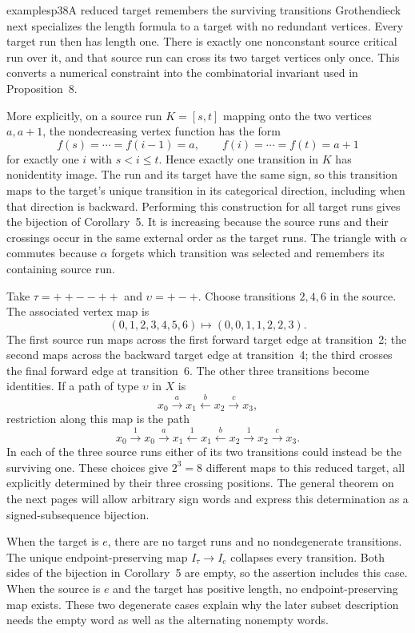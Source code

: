 \begin{dcomment}{examples}{p38}{A reduced target remembers the surviving transitions}
Grothendieck next specializes the length formula to a target with no redundant vertices. Every target run then has length one. There is exactly one nonconstant source critical run over it, and that source run can cross its two target vertices only once. This converts a numerical constraint into the combinatorial invariant used in Proposition~8.

More explicitly, on a source run $K=[s,t]$ mapping onto the two vertices $a,a+1$, the nondecreasing vertex function has the form
\[
 f(s)=\cdots=f(i-1)=a,
 \qquad
 f(i)=\cdots=f(t)=a+1
\]
for exactly one $i$ with $s<i\leq t$. Hence exactly one transition in $K$ has nonidentity image. The run and its target have the same sign, so this transition maps to the target's unique transition in its categorical direction, including when that direction is backward. Performing this construction for all target runs gives the bijection of Corollary~5. It is increasing because the source runs and their crossings occur in the same external order as the target runs. The triangle with $\alpha$ commutes because $\alpha$ forgets which transition was selected and remembers its containing source run.

Take $\tau=++--++$ and $\upsilon=+-+$. Choose transitions $2,4,6$ in the source. The associated vertex map is
\[
 (0,1,2,3,4,5,6)\longmapsto(0,0,1,1,2,2,3).
\]
The first source run maps across the first forward target edge at transition~2; the second maps across the backward target edge at transition~4; the third crosses the final forward edge at transition~6. The other three transitions become identities. If a path of type $\upsilon$ in $X$ is
\[
 x_0\xrightarrow{a}x_1\xleftarrow{b}x_2\xrightarrow{c}x_3,
\]
restriction along this map is the path
\[
 x_0\xrightarrow{1}x_0\xrightarrow{a}x_1
 \xleftarrow{1}x_1\xleftarrow{b}x_2
 \xrightarrow{1}x_2\xrightarrow{c}x_3.
\]
In each of the three source runs either of its two transitions could instead be the surviving one. These choices give $2^3=8$ different maps to this reduced target, all explicitly determined by their three crossing positions. The general theorem on the next pages will allow arbitrary sign words and express this determination as a signed-subsequence bijection.

When the target is $e$, there are no target runs and no nondegenerate transitions. The unique endpoint-preserving map $I_\tau\to I_e$ collapses every transition. Both sides of the bijection in Corollary~5 are empty, so the assertion includes this case. When the source is $e$ and the target has positive length, no endpoint-preserving map exists. These two degenerate cases explain why the later subset description needs the empty word as well as the alternating nonempty words.
\end{dcomment}

